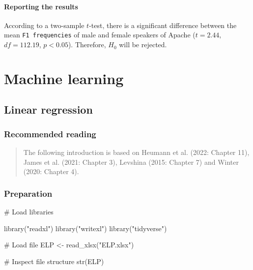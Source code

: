 \documentclass[
  11pt,
  letterpaper,
  DIV=11,
  numbers=noendperiod]{scrreprt}
\newenvironment{Shaded}{\begin{snugshade}}{\end{snugshade}}
\newcommand{\CommentTok}[1]{\textcolor[rgb]{0.37,0.37,0.37}{#1}}
\newcommand{\FunctionTok}[1]{\textcolor[rgb]{0.28,0.35,0.67}{#1}}
\newcommand{\NormalTok}[1]{\textcolor[rgb]{0.00,0.23,0.31}{#1}}
\newcommand{\OtherTok}[1]{\textcolor[rgb]{0.00,0.23,0.31}{#1}}
\newcommand{\StringTok}[1]{\textcolor[rgb]{0.13,0.47,0.30}{#1}}
\begin{document}
\subsection{Reporting the results}\label{reporting-the-results-1}

According to a two-sample \(t\)-test, there is a significant difference
between the mean \texttt{F1\ frequencies} of male and female speakers of
Apache (\(t = 2.44\), \(df = 112.19\), \(p < 0.05\)). Therefore, \(H_0\)
will be rejected.

\part{Machine learning}

\chapter{Linear regression}\label{linear-regression}

\section{Recommended reading}\label{recommended-reading-4}

\begin{quote}
The following introduction is based on Heumann et al. (2022: Chapter
11), James et al. (2021: Chapter 3), Levshina (2015: Chapter 7) and
Winter (2020: Chapter 4).
\end{quote}

\section{Preparation}\label{preparation-7}

\begin{Shaded}
\begin{Highlighting}[]
\CommentTok{\# Load libraries}

\FunctionTok{library}\NormalTok{(}\StringTok{"readxl"}\NormalTok{)}
\FunctionTok{library}\NormalTok{(}\StringTok{"writexl"}\NormalTok{)}
\FunctionTok{library}\NormalTok{(}\StringTok{"tidyverse"}\NormalTok{)}

\CommentTok{\# Load file}
\NormalTok{ELP }\OtherTok{\textless{}{-}} \FunctionTok{read\_xlsx}\NormalTok{(}\StringTok{"ELP.xlsx"}\NormalTok{)}

\CommentTok{\# Inspect file structure}
\FunctionTok{str}\NormalTok{(ELP)}
\end{Highlighting}
\end{Shaded}
\end{document}
